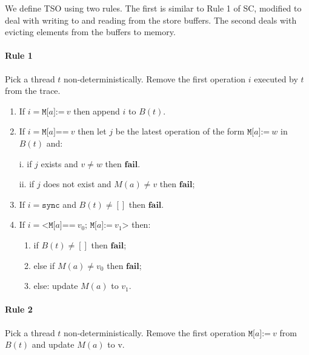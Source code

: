 \documentclass[11pt]{article}
\begin{document}
We define TSO using two rules.  The first is similar to Rule 1 of SC,
modified to deal with writing to and reading from the store buffers.
The second deals with evicting elements from the buffers to memory.

\paragraph{Rule 1}

Pick a thread $t$ non-deterministically.  Remove the first operation
$i$ executed by $t$ from the trace.

\begin{enumerate}
\item 
     If $i = \texttt{M[}a\texttt{]:=}~v$ then append $i$ to $B(t)$.

\item 
     If $i = \texttt{M[}a\texttt{]==}~v$ then let $j$ be the latest
     operation of the form $\texttt{M[}a\texttt{]:=}~w$ in
     $B(t)$ and:
     
       i.   if $j$ exists and $v \neq w$ then $\textbf{fail}$.

       ii.  if $j$ does not exist and $M(a) \neq v$ then $\textbf{fail}$;

\item 
     If $i = \texttt{sync}$ and $B(t) \neq []$ then $\textbf{fail}$.

\item
     If $i = \texttt{<M[}a\texttt{]==}~v_0\texttt{; M[}a\texttt{]:=}~v_1
     \texttt{>}$ then:

\begin{enumerate}[i]
\item
           if $B(t) \neq []$ then $\textbf{fail}$;

\item
           else if $M(a) \neq v_0$ then $\textbf{fail}$;

\item
           else: update $M(a)$ to $v_1$.
\end{enumerate}
\end{enumerate}

\paragraph{Rule 2}

Pick a thread $t$ non-deterministically. Remove the first operation
$\texttt{M[}a\texttt{]:=}~v$ from $B(t)$ and update $M(a)$ to v.
\end{document}
